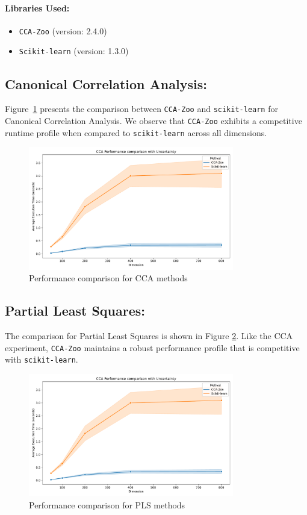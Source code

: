 \paragraph{Libraries Used:}
\begin{itemize}
    \item \texttt{CCA-Zoo} (version: 2.4.0)
    \item \texttt{Scikit-learn} (version: 1.3.0)
\end{itemize}

\subsection{Canonical Correlation Analysis:}
Figure~\ref{fig:cca_benchmark} presents the comparison between \texttt{CCA-Zoo} and \texttt{scikit-learn} for Canonical Correlation Analysis. We observe that \texttt{CCA-Zoo} exhibits a competitive runtime profile when compared to \texttt{scikit-learn} across all dimensions.

\begin{figure}[h]
    \centering
    \includegraphics[width=0.8\textwidth]{figures/CCA_Speed_Benchmark}
    \caption{Performance comparison for CCA methods}
    \label{fig:cca_benchmark}
\end{figure}

\subsection{Partial Least Squares:}
The comparison for Partial Least Squares is shown in Figure \ref{fig:pls_benchmark}.
Like the CCA experiment, \texttt{CCA-Zoo} maintains a robust performance profile that is competitive with \texttt{scikit-learn}.

\begin{figure}[h]
    \centering
    \includegraphics[width=0.8\textwidth]{figures/CCA_Speed_Benchmark}
    \caption{Performance comparison for PLS methods}
    \label{fig:pls_benchmark}
\end{figure}

